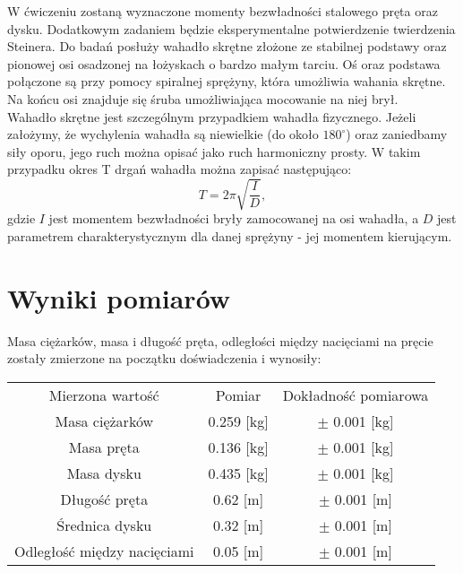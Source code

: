 \documentclass[10pt,a4paper]{article}
\newcommand{\forceindent}{\leavevmode{\parindent=3em\indent}}
\begin{document}
\forceindent W ćwiczeniu zostaną wyznaczone momenty bezwładności stalowego pręta oraz dysku. Dodatkowym
zadaniem będzie eksperymentalne potwierdzenie twierdzenia Steinera. Do badań posłuży wahadło skrętne
złożone ze stabilnej podstawy oraz pionowej osi osadzonej na łożyskach o bardzo małym tarciu. Oś oraz
podstawa połączone są przy pomocy spiralnej sprężyny, która umożliwia wahania skrętne. Na końcu osi
znajduje się śruba umożliwiająca mocowanie na niej brył.\\
\forceindent Wahadło skrętne jest szczególnym przypadkiem wahadła fizycznego. Jeżeli założymy, że wychylenia
wahadła są niewielkie (do około $180^{\circ}$) oraz zaniedbamy siły oporu, jego ruch można opisać jako ruch
harmoniczny prosty. W takim przypadku okres T drgań wahadła można zapisać następująco:
\begin{equation}
T = 2 \pi \sqrt{\frac{I}{D}},
\end{equation}
gdzie $I$ jest momentem bezwładności bryły zamocowanej na osi wahadła, a $D$ jest parametrem charakterystycznym dla danej sprężyny - jej momentem kierującym.

\newpage
\section{Wyniki pomiarów}
\forceindent Masa ciężarków, masa i długość pręta, odległości między nacięciami na pręcie zostały zmierzone na początku doświadczenia i wynosiły:\\
\begin{center}
\begin{tabular}{|c|c|c|}
\hline
Mierzona wartość & Pomiar & Dokładność pomiarowa\\
\hhline{|=|=|=|}
Masa ciężarków & 0.259 [kg] & $\pm$ 0.001 [kg]\\
Masa pręta & 0.136 [kg] & $\pm$ 0.001 [kg]\\
Masa dysku & 0.435 [kg] & $\pm$ 0.001 [kg]\\
\hline
Długość pręta & 0.62 [m] & $\pm$ 0.001 [m]\\
Średnica dysku & 0.32 [m] & $\pm$ 0.001 [m]\\
\hline
Odległość między nacięciami & 0.05 [m] & $\pm$ 0.001 [m]\\
\hline

\end{tabular}
\end{center}
\vspace{10pt}
\end{document}
